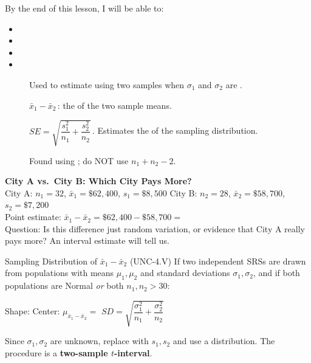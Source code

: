 \documentclass[10pt]{article}
\begin{document}
\namedateperiod

\vspace{0.15in}

\begin{objectivebox}
By the end of this lesson, I will be able to:
\begin{itemize}
  \item \writeline
  \item \writeline
  \item \writeline
  \item \writeline
\end{itemize}
\end{objectivebox}

\begin{vocabbox}
\begin{description}
  \item[]
        Used to estimate \blank{5cm} using two \blank{3cm} samples when
        $\sigma_1$ and $\sigma_2$ are \blank{2cm}.
  \item[]
        $\bar x_1 - \bar x_2$\,: the \blank{4cm} of the two sample means.
  \item[]
        $SE = \sqrt{\dfrac{s_1^2}{n_1} + \dfrac{s_2^2}{n_2}}$\,. \quad
        Estimates the \blank{5cm} of the sampling distribution.
  \item[]
        Found using \blank{3cm}; do NOT use $n_1 + n_2 - 2$.
\end{description}
\end{vocabbox}

\begin{hookbox}
\textbf{City A vs.\ City B: Which City Pays More?}\\
City A: $n_1 = 32$, $\bar x_1 = \$62{,}400$, $s_1 = \$8{,}500$ \quad
City B: $n_2 = 28$, $\bar x_2 = \$58{,}700$, $s_2 = \$7{,}200$\\[4pt]
Point estimate: $\bar x_1 - \bar x_2 = \$62{,}400 - \$58{,}700 = $ \blank{3cm}\\[4pt]
Question: Is this difference just random variation, or evidence that City A really pays more?
An interval estimate will tell us.
\end{hookbox}

\begin{notesbox}{Sampling Distribution of $\bar x_1 - \bar x_2$ (UNC-4.V)}
If two independent SRSs are drawn from populations with means $\mu_1, \mu_2$ and standard
deviations $\sigma_1, \sigma_2$, and if both populations are Normal \emph{or}
both $n_1, n_2 > 30$:

\begin{center}
Shape: \blank{4cm} \quad
Center: $\mu_{\bar x_1 - \bar x_2} = $ \blank{4cm} \quad
$SD = \sqrt{\dfrac{\sigma_1^2}{n_1} + \dfrac{\sigma_2^2}{n_2}}$
\end{center}

Since $\sigma_1, \sigma_2$ are unknown, replace with $s_1, s_2$ and use a
\blank{3cm} distribution. The procedure is a \textbf{two-sample $t$-interval}.
\end{notesbox}
\end{document}
